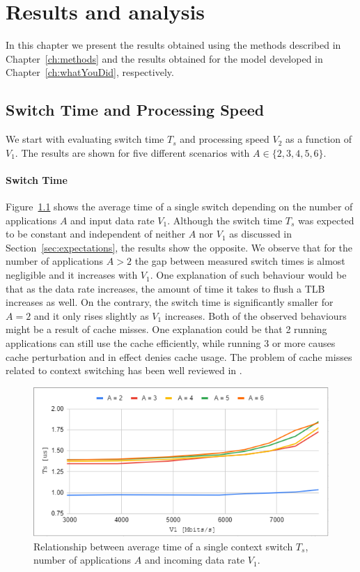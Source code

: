 \documentclass[english]{kththesis}
\begin{document}
\cleardoublepage
\chapter{Results and analysis}
\label{ch:resultsAndAnalysis}
In this chapter we present the results obtained using the methods described in Chapter~\ref{ch:methods} and the results obtained for the model developed in Chapter~\ref{ch:whatYouDid}, respectively.

\section{Switch Time and Processing Speed}
We start with evaluating switch time \(T_s\) and processing speed \(V_2\) as a function of \(V_1\). The results are shown for five different scenarios with \(A \in \{2,3,4,5,6\}\).

\subsubsection{Switch Time}
Figure~\ref{fig:switchtime} shows the average time of a single switch depending on the number of applications \(A\) and input data rate \(V_1\). Although the switch time \(T_s\) was expected to be constant and independent of neither \(A\) nor \(V_1\) as discussed in Section~\ref{sec:expectations}, the results show the opposite. We observe that for the number of applications \(A > 2\) the gap between measured switch times is almost negligible and it increases with \(V_1\). One explanation of such behaviour would be that as the data rate increases, the amount of time it takes to flush a \gls{TLB} increases as well. On the contrary, the switch time is significantly smaller for \(A = 2\) and it only rises slightly as \(V_1\) increases. Both of the observed behaviours might be a result of cache misses. One explanation could be that 2 running applications can still use the cache efficiently, while running 3 or more causes cache perturbation and in effect denies cache usage. The problem of cache misses related to context switching has been well reviewed in \cite{context_switch_cache}.

\begin{figure}[!ht]
  \centering
    \includegraphics[width=1\textwidth]{Fig16.png}
  \caption{Relationship between average time of a single context switch \(T_s\), number of applications \(A\) and incoming data rate \(V_1\).}
  \label{fig:switchtime}
\end{figure}
\end{document}

